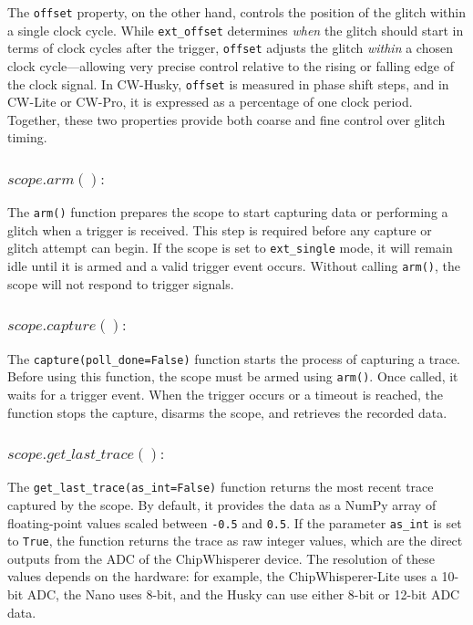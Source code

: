 The \texttt{offset} property, on the other hand, controls the position of the glitch within a single clock cycle. While \texttt{ext\_offset} determines \emph{when} the glitch should start in terms of clock cycles after the trigger, \texttt{offset} adjusts the glitch \emph{within} a chosen clock cycle—allowing very precise control relative to the rising or falling edge of the clock signal. In CW-Husky, \texttt{offset} is measured in phase shift steps, and in CW-Lite or CW-Pro, it is expressed as a percentage of one clock period. Together, these two properties provide both coarse and fine control over glitch timing.


\subsubsection{$scope.arm() :$}
The \texttt{arm()} function prepares the scope to start capturing data or performing a glitch when a trigger is received. This step is required before any capture or glitch attempt can begin. If the scope is set to \texttt{ext\_single} mode, it will remain idle until it is armed and a valid trigger event occurs. Without calling \texttt{arm()}, the scope will not respond to trigger signals.

\subsubsection{$scope.capture() :$}
The \texttt{capture(poll\_done=False)} function starts the process of capturing a trace. Before using this function, the scope must be armed using \texttt{arm()}. Once called, it waits for a trigger event. When the trigger occurs or a timeout is reached, the function stops the capture, disarms the scope, and retrieves the recorded data.


\subsubsection{$scope.get\_last\_trace() :$}
The \texttt{get\_last\_trace(as\_int=False)} function returns the most recent trace captured by the scope. By default, it provides the data as a NumPy array of floating-point values scaled between \texttt{-0.5} and \texttt{0.5}. If the parameter \texttt{as\_int} is set to \texttt{True}, the function returns the trace as raw integer values, which are the direct outputs from the ADC of the ChipWhisperer device. The resolution of these values depends on the hardware: for example, the ChipWhisperer-Lite uses a 10-bit ADC, the Nano uses 8-bit, and the Husky can use either 8-bit or 12-bit ADC data.

